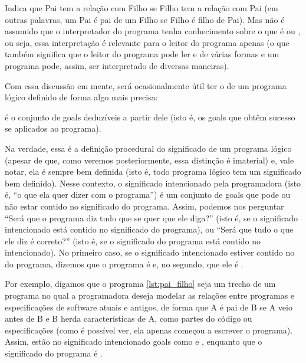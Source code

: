 \documentclass{article}
\begin{document}
Indica que Pai tem a relação  com Filho se Filho tem a relação  com Pai (em outras palavras, um Pai é pai de um Filho se Filho é filho de Pai). Mas não é assumido que o interpretador do programa tenha conhecimento sobre o que é  ou , ou seja, essa interpretação é relevante para o leitor do programa apenas (o que também significa que o leitor do programa pode ler  e  de várias formas e um programa pode, assim,
ser interpretado de diversas maneiras).

Com essa discussão em mente, será ocasionalmente útil ter o  de um programa lógico definido de forma algo mais precisa:

  \theoremstyle{definition}
  \begin{definition}  é o conjunto de goals deduzíveis a partir dele (isto é, os goals que obtêm sucesso se aplicados ao programa).
  \end{definition}

  Na verdade, essa é a definição procedural do significado de um programa lógico (apesar de que, como veremos posteriormente, essa distinção é imaterial) e, vale notar, ela é sempre bem definida (isto é, todo programa lógico tem um significado bem definido). Nesse contexto, o significado intencionado pela programadora (isto é, ``o que ela quer dizer com o programa'') é um conjunto de goals que pode ou não estar contido no significado do programa. Assim, podemos nos perguntar ``Será que o
  programa diz tudo que se quer que ele diga?'' (isto é, se o significado intencionado está contido no significado do programa), ou ``Será que tudo o que ele diz é correto?'' (isto é, se o significado do programa está contido no intencionado). No primeiro caso, se o significado intencionado estiver contido no do programa, dizemos que o programa é  e, no segundo, que ele é .

  Por exemplo, digamos que o programa \ref{lst:pai_filho}  seja um trecho de um programa no qual a programadora deseja modelar as relações entre programas e especificações de software atuais e antigos, de forma que A é pai de B se A veio antes de B e B herda características de A, como partes do código ou especificações (como é possível ver, ela apenas começou a escrever o programa). Assim, estão no significado intencionado goals como  e , enquanto que o
  significado do programa é .
\end{document}
